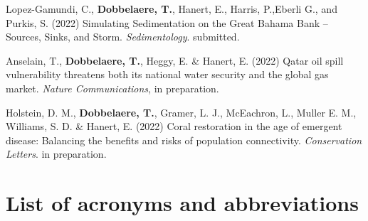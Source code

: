 \begin{list}{}{%
    \setlength{\topsep}{0pt}%
    \setlength{\leftmargin}{0.23in}%
    \setlength{\listparindent}{-0.23in}%
    \setlength{\itemindent}{-0.23in}%
    \setlength{\parsep}{\parskip}%
    }
    \item Lopez-Gamundi, C., \textbf{Dobbelaere, T.}, Hanert, E., Harris, P.,Eberli G., and Purkis, S. (2022) Simulating Sedimentation on the Great Bahama Bank – Sources, Sinks, and Storm. \textit{Sedimentology}. submitted.
    
    \item Anselain, T., \textbf{Dobbelaere, T.}, Heggy, E. \& Hanert, E. (2022) Qatar oil spill vulnerability threatens both its national water security and the global gas market. \textit{Nature Communications}, in preparation.
    
    \item Holstein, D. M., \textbf{Dobbelaere, T.}, Gramer, L. J., McEachron, L., Muller E. M., Williams, S. D. \& Hanert, E. (2022) Coral restoration in the age of emergent disease: Balancing the benefits and risks of population connectivity. \textit{Conservation Letters}. in preparation. 
    
\end{list}
\newpage 
\section{List of acronyms and abbreviations}

